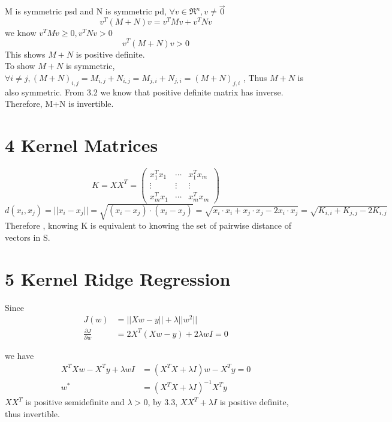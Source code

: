 \documentclass{article}
\newenvironment{sub}[2][$-$]{\begin{trivlist}
		\item[\hskip \labelsep {\bfseries #1}\hskip \labelsep {\bfseries #2.}]}  {\end{trivlist}}
\begin{document}
\begin{sub}{3.4}
\end{sub}

M is symmetric psd and N is symmetric pd, $\forall  v \in \Re^n ,v \neq \vec{0}$
$$v^T(M+N)v = v^TMv + v^TNv$$
we know $v^TMv \geq 0, v^TNv > 0 $
$$v^T(M+N)v > 0 $$
This shows $M+N$ is positive definite. \\
To show $M+N$ is symmetric, $\forall i \neq j, (M+N)_{i,j} = M_{i,j} + N_{i,j} = M_{j,i} + N_{j,i} = (M+N)_{j,i}$ , Thus $M+N$ is also symmetric. 
From 3.2 we know that positive definite matrix has inverse. Therefore, M+N is invertible. 

\section{4 Kernel Matrices}
$$K = XX^T = \begin{pmatrix}
x_1^Tx_1 & \cdots & x_1^Tx_m\\
\vdots&\vdots &\vdots\\
x_m^Tx_1 & \cdots &x_m^Tx_m
\end{pmatrix}$$
$d(x_i,x_j) = ||x_i - x_j|| = \sqrt{(x_i - x_j)\cdot (x_i - x_j)} = \sqrt{x_i\cdot x_i + x_j \cdot x_j -2 x_i \cdot x_j} = \sqrt{K_{i,i} + K_{j,j} - 2 K_{i,j}}$\\
Therefore , knowing K is equivalent to knowing the set of pairwise distance of vectors in S.

\pagebreak 

\section{5 Kernel Ridge Regression}
\begin{sub}{5.1}
\end{sub}
Since 
\begin{align}
J(w)  &= ||Xw - y|| + \lambda ||w^2||\\
\frac{\partial J}{\partial w} &= 2X^T(Xw - y) + 2\lambda wI = 0
\end{align}

we have \begin{align}
X^TXw - X^Ty + \lambda wI & = (X^TX+\lambda I)w - X^Ty= 0\\
w^* &= (X^TX+\lambda I)^{-1} X^Ty
\end{align}
$XX^T$ is positive semidefinite and $\lambda >0$, by 3.3, $XX^T + \lambda I$ is positive definite, thus invertible. 

\begin{sub}{5.2}
\end{sub}
\end{document}
